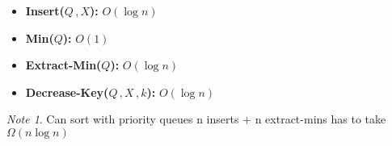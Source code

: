 \documentclass{article}
\theoremstyle{definition}
\theoremstyle{remark}
\newtheorem{note}{Note}[section]
\theoremstyle{plain}
\begin{document}
\begin{itemize}
	\item \textbf{Insert($Q\,,X$):} $O (\log n)$
	\item \textbf{Min($Q$):} $O (1)$
	\item \textbf{Extract-Min($Q$):} $O (\log n)$
	\item \textbf{Decrease-Key($Q\,,X\,,k$):} $O (\log n)$
\end{itemize}

\begin{note}
Can sort with priority queues
n inserts + n extract-mins has to take $\Omega (n \log n)$
\end{note}
\end{document}
